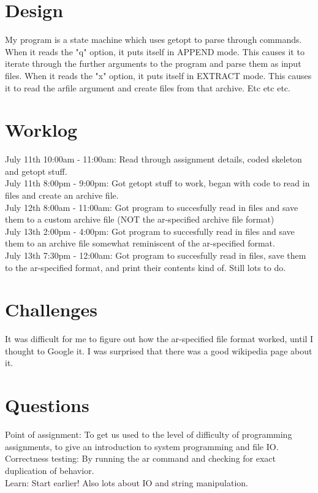 \documentclass[11pt]{article}
\begin{document}
\section{Design}
My program is a state machine which uses getopt to parse through commands. When it reads the "q" option, it puts itself in APPEND mode. This causes it to iterate through
the further arguments to the program and parse them as input files. When it reads the "x" option, it puts itself in EXTRACT mode. This causes it to read the arfile argument
and create files from that archive. Etc etc etc.

\section{Worklog}
July 11th 10:00am - 11:00am: Read through assignment details, coded skeleton and getopt stuff. \\

July 11th 8:00pm - 9:00pm: Got getopt stuff to work, began with code to read in files and create an archive file. \\

July 12th 8:00am - 11:00am: Got program to succesfully read in files and save them to a custom archive file (NOT the ar-specified archive file format) \\

July 13th 2:00pm - 4:00pm: Got program to succesfully read in files and save them to an archive file somewhat reminiscent of the ar-specified format. \\

July 13th 7:30pm - 12:00am: Got program to succesfully read in files, save them to the ar-specified format, and print their contents kind of. Still lots to do. \\

\section{Challenges}
It was difficult for me to figure out how the ar-specified file format worked, until I thought to Google it. I was surprised that there was a good wikipedia page about it. \\

\section{Questions}
Point of assignment: To get us used to the level of difficulty of programming assignments, to give an introduction to system programming and file IO. \\
Correctness testing: By running the ar command and checking for exact duplication of behavior. \\
Learn: Start earlier! Also lots about IO and string manipulation.\\
\end{document}
